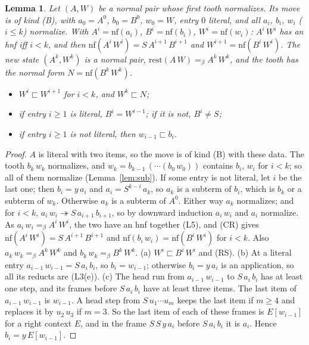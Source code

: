 \documentclass[11pt]{amsart}
\newtheorem{lemma}[theorem]{Lemma}
\theoremstyle{definition}
\newcommand{\red}{\twoheadrightarrow}
\newcommand{\conv}{=_\beta}
\newcommand{\rest}{\mathrm{rest}}
\newcommand{\nf}{\mathrm{nf}}
\newcommand{\psq}{\sqsubset}
\begin{document}
\begin{lemma}\label{lem:pair}
Let $(A,W)$ be a normal pair whose first tooth normalizes. Its move is of kind \textup{(B)}, with
$a_0=A^0$, $b_0=B^0$, $w_0=W$, entry $0$ literal, and all $a_i$, $b_i$, $w_i$ \textup{(}$i\le k$\textup{)}
normalize. With $A^i=\nf(a_i)$, $B^i=\nf(b_i)$, $W^i=\nf(w_i)$: $A^i\,W^i$ has an hnf iff $i<k$, and
then $\nf(A^i\,W^i)=S\,A^{i+1}\,B^{i+1}$ and $W^{i+1}=\nf(B^i\,W^i)$. The \emph{new state}
$(A^k,W^k)$ is a normal pair, $\rest(A\,W)\conv A^k\,W^k$, and the tooth has the normal form
$N=\nf(B^k\,W^k)$.
\begin{itemize}
\item[(a)] $W^i\psq W^{i+1}$ for $i<k$, and $W^k\psq N$;
\item[(b)] if entry $i\ge1$ is literal, $B^i=W^{i-1}$; if it is not, $B^i\ne S$;
\item[(c)] if entry $i\ge1$ is not literal, then $w_{i-1}\psq b_i$.
\end{itemize}
\end{lemma}

\begin{proof}
$A$ is literal with two items, so the move is of kind (B) with these data. The tooth $b_k\,w_k$
normalizes, and $w_k=b_{k-1}\,(\cdots(b_0\,w_0))$ contains $b_i$, $w_i$ for $i<k$; so all of them
normalize (Lemma~\ref{lem:sub}). If some entry is not literal, let $i$ be the last one; then
$b_i=y\,a_i$ and $a_i=S^{k-i}\,a_k$, so $a_k$ is a subterm of $b_i$, which is $b_k$ or a subterm of
$w_k$. Otherwise $a_k$ is a subterm of $A^0$. Either way $a_k$ normalizes; and for $i<k$,
$a_i\,w_i\red S\,a_{i+1}\,b_{i+1}$, so by downward induction $a_i\,w_i$ and $a_i$ normalize. As
$a_i\,w_i\conv A^i\,W^i$, the two have an hnf together (L5), and (CR) gives
$\nf(A^i\,W^i)=S\,A^{i+1}\,B^{i+1}$ and $\nf(b_i\,w_i)=\nf(B^i\,W^i)$ for $i<k$. Also
$a_k\,w_k\conv A^k\,W^k$ and $b_k\,w_k\conv B^k\,W^k$. (a) $W^i\psq B^i\,W^i$ and (RS). (b) At a
literal entry $a_{i-1}\,w_{i-1}=S\,a_i\,b_i$, so $b_i=w_{i-1}$; otherwise $b_i=y\,a_i$ is an
application, so all its reducts are (L3(e)).
(c) The head run from $a_{i-1}\,w_{i-1}$ to $S\,a_i\,b_i$ has at least one step, and its frames before
$S\,a_i\,b_i$ have at least three items. The last item of $a_{i-1}\,w_{i-1}$ is $w_{i-1}$. A head step
from $S\,u_1\cdots u_m$ keeps the last item if $m\ge4$ and replaces it by $u_2\,u_3$ if $m=3$. So the
last item of each of these frames is $E[w_{i-1}]$ for a right context $E$, and in the frame
$S\,S\,y\,a_i$ before $S\,a_i\,b_i$ it is $a_i$. Hence $b_i=y\,E[w_{i-1}]$.
\end{proof}
\end{document}
